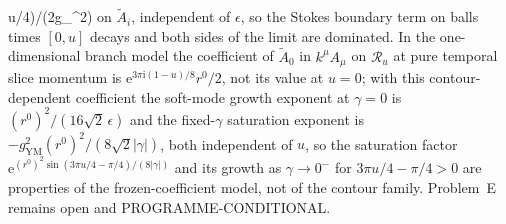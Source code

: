 u/4)/(2g_{}^2)\) on \(\tilde A_i\), independent of \(\epsilon\), so the Stokes boundary term on balls times \([0,u]\) decays and both sides of the limit are dominated. In the one-dimensional branch model the coefficient of \(\tilde A_0\) in \(k^\mu A_\mu\) on \(\mathcal R_u\) at pure temporal slice momentum is \(\mathrm e^{3\pi\mathrm i(1-u)/8}r^0/2\), not its value at \(u=0\); with this contour-dependent coefficient the soft-mode growth exponent at \(\gamma=0\) is \({(r^0)}^2/(16\sqrt2\,\epsilon)\) and the fixed-\(\gamma\) saturation exponent is \(-g_{\mathrm{YM}}^2{(r^0)}^2/(8\sqrt2|\gamma|)\), both independent of \(u\), so the saturation factor \(\mathrm e^{{(r^0)}^2\sin(3\pi u/4-\pi/4)/(8|\gamma|)}\) and its growth as \(\gamma\to0^-\) for \(3\pi u/4-\pi/4>0\) are properties of the frozen-coefficient model, not of the contour family. Problem~E remains open and PROGRAMME-CONDITIONAL.

